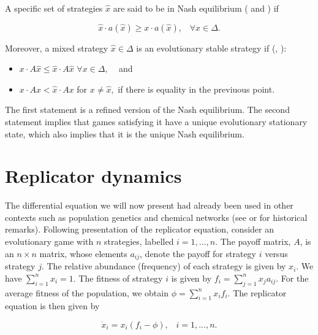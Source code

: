 \documentclass[10pt,a4paper]{article}
\begin{document}
A specific set of strategies $\hat{x}$ are said to be in Nash equilibrium (\cite{Nash:1950} and \cite{Nash:1951}) if 

\begin{equation}
 \hat{x}\cdot a(\hat{x}) \geq x \cdot a(\hat{x}), \; \; \; \forall x \in \Delta.
 \label{eq:nash}
\end{equation}

Moreover, a mixed strategy $\hat{x}\in\Delta$ is an evolutionary stable strategy if (\cite{Jonker:1978}, \cite{Smith:1982}):

\begin{itemize}
 \item $x\cdot A \hat{x} \leq \hat{x}\cdot A \hat{x}$ \hspace{0.6cm} $\forall x \in \Delta, \; \; \; $ and
 \item $x\cdot A x < \hat{x}\cdot A x$ \hspace{0.6cm} for $x\neq\hat{x},$ if there is equality in the previuous point.
\end{itemize}

The first statement is a refined version of the Nash equilibrium. The second statement implies that games satisfying it have a unique
evolutionary stationary state, which also implies that it is the unique Nash equilibrium.

\section{Replicator dynamics}

The differential equation we will now present had already been used in other contexts such as population genetics and chemical networks (see \cite{Hofbauer:1988} or \cite{Hofbauer:1998}
for historical remarks). Following \cite{Ohtsuki:replicator} presentation of the replicator equation, consider an evolutionary game with $n$ strategies, 
labelled $i=1,...,n$. The payoff matrix, $A$, is an $n\times n$ matrix, whose elements $a_{ij}$, denote the payoff for
strategy $i$ versus strategy $j$. The relative abundance (frequency) of each strategy is given by $x_i$. We have $\sum_{i=1}^{n} x_i = 1$. The fitness of strategy $i$ is given 
by $f_i = \sum_{j=1}^{n} x_j a_{ij}$. For the average fitness of the population, we obtain $\phi = \sum_{i=1}^n x_i f_i$. The replicator equation is then given by 

\begin{equation}
\dot{x}_i=x_i(f_i - \phi), \; \; \;  i=1,...,n.
\label{eq:replicator}
\end{equation}
\end{document}
